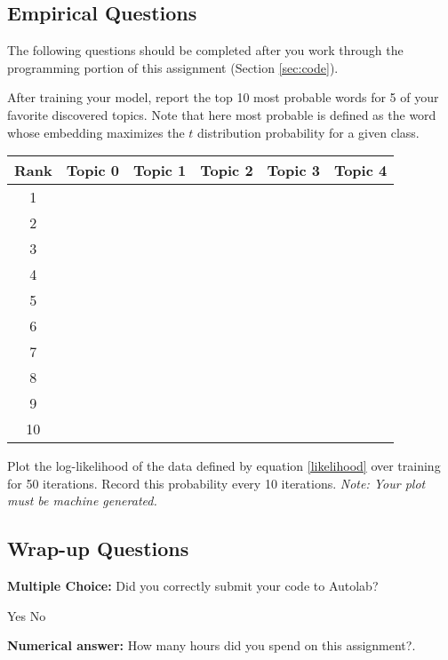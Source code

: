 \documentclass[11pt,addpoints,answers]{exam}
\numberwithin{equation}{section} %
\numberwithin{figure}{section} %
\numberwithin{table}{section} %
\begin{document}
\clearpage
\subsection{Empirical Questions}

The following questions should be completed after you work through the programming portion of this assignment (Section \ref{sec:code}). 

\begin{questions}
\question[10] After training your model, report the top 10 most probable words for 5 of your favorite discovered topics. Note that here most probable is defined as the word whose embedding maximizes the $t$ distribution probability for a given class. 
\bgroup
\def\arraystretch{1.5}
\begin{center}
\begin{tabular}{ |c|c|c|c|c|c| } 
 \hline
 \textbf{Rank} & \textbf{Topic 0} & \textbf{Topic 1} &  \textbf{Topic 2} & \textbf{Topic 3} & \textbf{Topic 4} \\
 \hline
1 & & & & & \\ \hline
2 & & & & & \\ \hline
3 & & & & & \\ \hline
4 & & & & & \\ \hline
5 & & & & & \\ \hline
6 & & & & & \\ \hline
7 & & & & & \\ \hline
8 & & & & & \\ \hline
9 & & & & & \\ \hline
10 & & & & & \\ \hline
\end{tabular}
\end{center}
\egroup
\question[10] Plot the log-likelihood of the data defined by equation \ref{likelihood} over training for 50 iterations. Record this probability every 10 iterations. \emph{Note: Your plot must be machine generated.}
\begin{tcolorbox}[fit,height=8cm, width=15cm, blank, borderline={1pt}{-2pt}]
\end{tcolorbox}

\end{questions}

\subsection{Wrap-up Questions}

\begin{questions}

\question[1] \textbf{Multiple Choice:} Did you correctly submit your code to Autolab?
    \begin{checkboxes}
     \choice Yes 
     \choice No
    \end{checkboxes}

\question[1] \textbf{Numerical answer:} How many hours did you spend on this assignment?.
    \begin{tcolorbox}[fit,height=1cm, width=2cm, blank, borderline={1pt}{-2pt}]
    \end{tcolorbox}

\end{questions}
\end{document}

